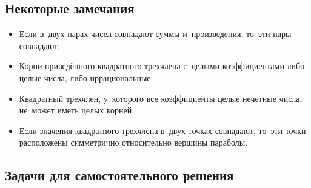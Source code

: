 


\begingroup
    \def\abs#1{\lvert #1 \rvert}%

%

\subsection*{Некоторые замечания}

\begin{itemize}
\item
Если в~двух парах чисел совпадают суммы и~произведения, то~эти пары совпадают.
\item
Корни приведённого квадратного трехчлена с~целыми коэффициентами  либо целые
числа, либо иррациональные.
\item
Квадратный трехчлен, у~которого все коэффициенты целые нечетные числа, не~может
иметь целых корней.
\item
Если значения квадратного трехчлена в~двух точках совпадают, то~эти точки
расположены симметрично относительно вершины параболы.
\end{itemize}

%
%

\subsection*{Задачи для самостоятельного решения}

